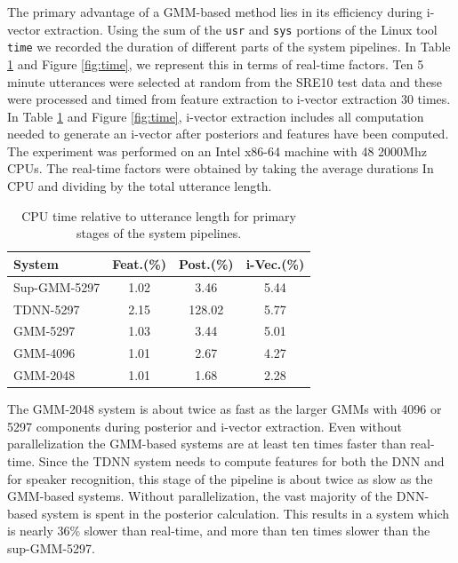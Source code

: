 \documentclass{article}
\begin{document}
The primary advantage of a GMM-based method lies in its
efficiency during i-vector extraction. Using the sum of the \texttt{usr}
and \texttt{sys}
portions of the Linux tool \texttt{time} we recorded the duration of
different parts of the system pipelines. In Table \ref{timing} and
Figure \ref{fig:time}, we represent this in terms of real-time factors.
Ten 5 minute utterances
were selected at random from the SRE10 test data and these were processed
and timed from feature extraction to i-vector extraction 30 times. 
In Table \ref{timing} and
Figure \ref{fig:time}, i-vector extraction
includes all computation needed to generate an i-vector after posteriors and features
have been computed. The experiment was performed on an Intel x86-64 machine with 48 2000Mhz CPUs.
The real-time factors were obtained by taking the average durations In CPU and
dividing by the total utterance length. 

\begin{table}
\caption{CPU time relative to utterance length for primary stages of the system pipelines.}
\begin{center}
\begin{tabular}{l|ccc}
\hline
System & Feat.(\%) & Post.(\%) & i-Vec.(\%)\\ \hline \hline
Sup-GMM-5297 & 1.02 & 3.46 & 5.44 \\
TDNN-5297 & 2.15 & 128.02 & 5.77  \\
GMM-5297 & 1.03 & 3.44 & 5.01 \\
GMM-4096 & 1.01 & 2.67 & 4.27 \\
GMM-2048 & 1.01 & 1.68 & 2.28 \\ \hline
\end{tabular}
\end{center}
\label{timing}
\end{table}


The GMM-2048 system is about twice as fast as the
larger GMMs with 4096 or 5297 components during posterior and i-vector
extraction. Even without
parallelization the GMM-based systems are at least ten times faster than
real-time. Since the TDNN system needs to compute features for both the
DNN and for speaker recognition, this stage of the pipeline is about twice
as slow as the GMM-based systems.
Without parallelization, the vast majority of the DNN-based system is spent 
in the posterior calculation. This results in a system which is nearly 36\% slower 
than real-time, and more than ten times slower than the sup-GMM-5297.
\end{document}
